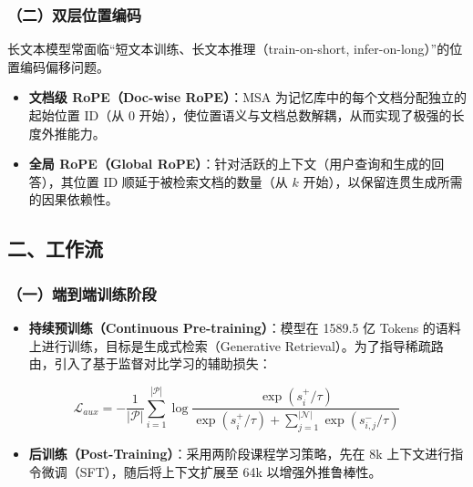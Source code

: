 \hypertarget{ux4e8cux53ccux5c42ux4f4dux7f6eux7f16ux7801}{%
\subsubsection{（二）双层位置编码}\label{ux4e8cux53ccux5c42ux4f4dux7f6eux7f16ux7801}}

长文本模型常面临``短文本训练、长文本推理（train-on-short, infer-on-long）''的位置编码偏移问题。

\begin{itemize}
\tightlist
\item
  \textbf{文档级 RoPE（Doc-wise RoPE）}：MSA 为记忆库中的每个文档分配独立的起始位置 ID（从 \(0\) 开始），使位置语义与文档总数解耦，从而实现了极强的长度外推能力。
\item
  \textbf{全局 RoPE（Global RoPE）}：针对活跃的上下文（用户查询和生成的回答），其位置 ID 顺延于被检索文档的数量（从 \(k\) 开始），以保留连贯生成所需的因果依赖性。
\end{itemize}

\hypertarget{ux4e8cux5de5ux4f5cux6d41-4}{%
\subsection{二、工作流}\label{ux4e8cux5de5ux4f5cux6d41-4}}

\hypertarget{ux4e00ux7aefux5230ux7aefux8badux7ec3ux9636ux6bb5}{%
\subsubsection{（一）端到端训练阶段}\label{ux4e00ux7aefux5230ux7aefux8badux7ec3ux9636ux6bb5}}

\begin{itemize}
\tightlist
\item
  \textbf{持续预训练（Continuous Pre-training）}：模型在 1589.5 亿 Tokens 的语料上进行训练，目标是生成式检索（Generative Retrieval）。为了指导稀疏路由，引入了基于监督对比学习的辅助损失：
\end{itemize}

\[
\mathcal{L}_{aux}=-\frac{1}{|\mathcal{P}|}\sum_{i=1}^{|\mathcal{P}|}
\log \frac{\exp(s_i^+/\tau)}
{\exp(s_i^+/\tau)+\sum_{j=1}^{|\mathcal{N}|}\exp(s_{i,j}^-/\tau)}
\]

\begin{itemize}
\tightlist
\item
  \textbf{后训练（Post-Training）}：采用两阶段课程学习策略，先在 8k 上下文进行指令微调（SFT），随后将上下文扩展至 64k 以增强外推鲁棒性。
\end{itemize}

